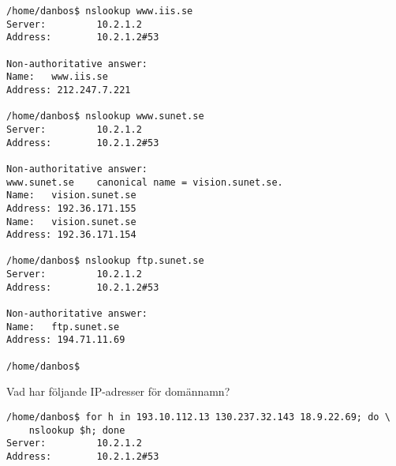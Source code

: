 \documentclass[11pt,a4paper]{miunasgn}
\begin{document}
\begin{questions}
\begin{solution}
	\begin{lstlisting}
/home/danbos$ nslookup www.iis.se
Server:         10.2.1.2
Address:        10.2.1.2#53

Non-authoritative answer:
Name:   www.iis.se
Address: 212.247.7.221

/home/danbos$ nslookup www.sunet.se
Server:         10.2.1.2
Address:        10.2.1.2#53

Non-authoritative answer:
www.sunet.se    canonical name = vision.sunet.se.
Name:   vision.sunet.se
Address: 192.36.171.155
Name:   vision.sunet.se
Address: 192.36.171.154

/home/danbos$ nslookup ftp.sunet.se
Server:         10.2.1.2
Address:        10.2.1.2#53

Non-authoritative answer:
Name:   ftp.sunet.se
Address: 194.71.11.69

/home/danbos$ 
	\end{lstlisting}
\end{solution}

\question\label{q:IPLookup}
Vad har följande IP-adresser för domännamn?
\begin{solution}
	\begin{lstlisting}
/home/danbos$ for h in 193.10.112.13 130.237.32.143 18.9.22.69; do \
	nslookup $h; done
Server:         10.2.1.2
Address:        10.2.1.2#53


\end{lstlisting}
\end{solution}
\end{questions}
\end{document}

